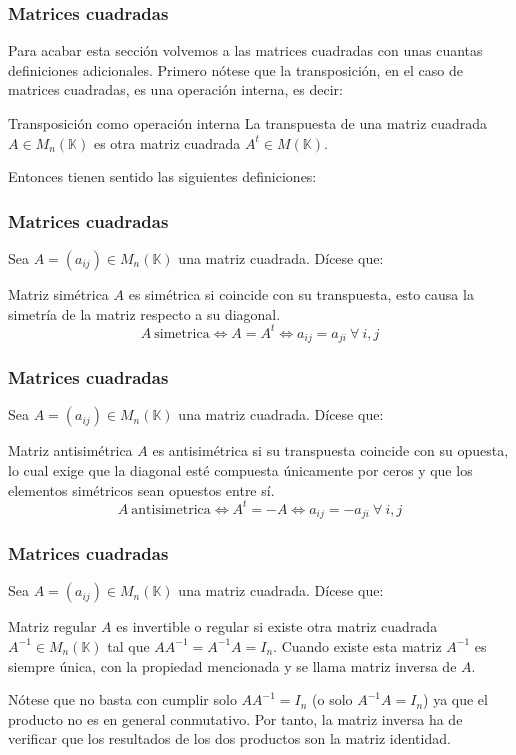 \documentclass[aspectratio=169]{beamer}
\begin{document}
 
 \begin{frame}
  \frametitle{Matrices cuadradas}
Para acabar esta secci\'on volvemos a las matrices cuadradas con unas cuantas definiciones adicionales. Primero n\'otese que la transposici\'on, en el caso de matrices cuadradas, es una operaci\'on interna, es decir:

  \begin{block}{Transposici\'on como operaci\'on interna}
La transpuesta de una matriz cuadrada $A\in M_n(\mathbb{K})$  es otra matriz cuadrada $A^t\in M(\mathbb{K})$.
\end{block}

 Entonces tienen sentido las siguientes definiciones:
 \end{frame} 


 \begin{frame}
  \frametitle{Matrices cuadradas}
Sea $A=(a_{ij})\in M_n(\mathbb{K})$ una matriz cuadrada. D\'icese que:
  \begin{block}{Matriz sim\'etrica}
$A$ es sim\'etrica si coincide con su transpuesta, esto causa la simetr\'ia de la matriz respecto a su diagonal.
\[A \ \mathrm{simetrica} \Longleftrightarrow A = A^t \Longleftrightarrow a_{ij} = a_{ji}\ \forall\ i,j \]
\end{block}
 \end{frame} 
 
  \begin{frame}
  \frametitle{Matrices cuadradas}
Sea $A=(a_{ij})\in M_n(\mathbb{K})$ una matriz cuadrada. D\'icese que:
 
  \begin{block}{Matriz antisim\'etrica}
$A$ es antisim\'etrica si su transpuesta coincide con su opuesta, lo cual exige que la diagonal est\'e compuesta \'unicamente por ceros y que los elementos sim\'etricos sean opuestos entre s\'i.
\[A \ \mathrm{antisimetrica} \Longleftrightarrow A^t = -A \Longleftrightarrow a_{ij} = -a_{ji}\ \forall\ i,j \]
\end{block}
 \end{frame} 



 \begin{frame}
  \frametitle{Matrices cuadradas}
Sea $A=(a_{ij})\in M_n(\mathbb{K})$ una matriz cuadrada. D\'icese que:
  \begin{block}{Matriz regular}
$A$ es invertible o regular si existe otra matriz cuadrada $A^{-1} \in M_n(\mathbb{K})$ tal que $AA^{-1} = A^{-1}A = I_n$. Cuando existe esta matriz $A^{-1}$ es siempre \'unica, con la propiedad mencionada y se llama matriz inversa de $A$.
\end{block}

N\'otese que no basta con cumplir solo $AA^{-1} = I_n$ (o solo $A^{-1}A = I_n$) ya que el producto no es en general conmutativo. Por tanto, la matriz inversa ha de verificar que los resultados de los dos productos son la matriz identidad.

 \end{frame} 
 
\end{document}
